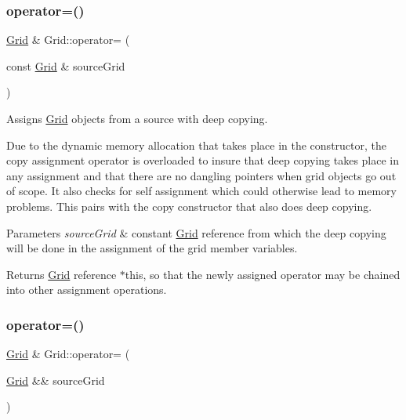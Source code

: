 \subsubsection{\texorpdfstring{operator=()}{operator=()}\hspace{0.1cm}{\footnotesize\ttfamily [1/2]}}
{\footnotesize\ttfamily \hyperlink{class_grid}{Grid} \& Grid\+::operator= (\begin{DoxyParamCaption}\item[{const \hyperlink{class_grid}{Grid} \&}]{source\+Grid }\end{DoxyParamCaption})}



Assigns \hyperlink{class_grid}{Grid} objects from a source with deep copying. 

Due to the dynamic memory allocation that takes place in the constructor, the copy assignment operator is overloaded to insure that deep copying takes place in any assignment and that there are no dangling pointers when grid objects go out of scope. It also checks for self assignment which could otherwise lead to memory problems. This pairs with the copy constructor that also does deep copying.


\begin{DoxyParams}{Parameters}
{\em source\+Grid} & constant \hyperlink{class_grid}{Grid} reference from which the deep copying will be done in the assignment of the grid member variables.\\
\hline
\end{DoxyParams}
\begin{DoxyReturn}{Returns}
\hyperlink{class_grid}{Grid} reference $\ast$this, so that the newly assigned operator may be chained into other assignment operations. 
\end{DoxyReturn}
\mbox{\label{class_grid_a9f84434eb37abc5cd0979cd609b2a2d8}} 
\subsubsection{\texorpdfstring{operator=()}{operator=()}\hspace{0.1cm}{\footnotesize\ttfamily [2/2]}}
{\footnotesize\ttfamily \hyperlink{class_grid}{Grid} \& Grid\+::operator= (\begin{DoxyParamCaption}\item[{\hyperlink{class_grid}{Grid} \&\&}]{source\+Grid }\end{DoxyParamCaption})}



